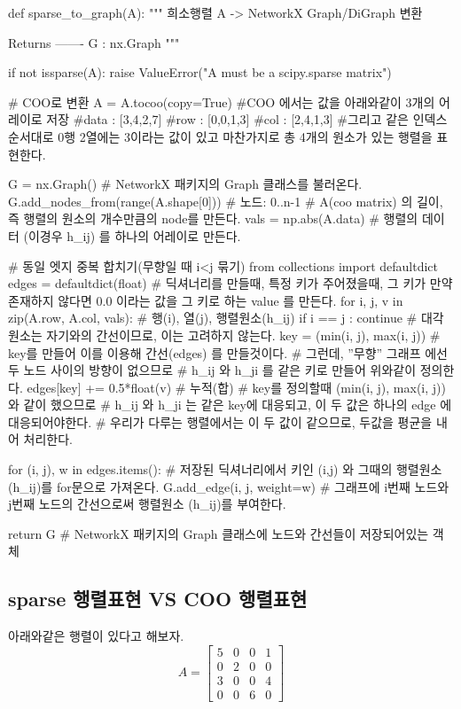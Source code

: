 \documentclass[11pt]{article}
\begin{document}
\begin{CodeBox}[title={Example: Python snippet}]
def sparse_to_graph(A):
    """
    희소행렬 A -> NetworkX Graph/DiGraph 변환

    Returns
    -------
    G : nx.Graph
    """
    
    if not issparse(A):
        raise ValueError("A must be a scipy.sparse matrix")
    
    # COO로 변환
    A = A.tocoo(copy=True)
    #COO 에서는 값을 아래와같이 3개의 어레이로 저장 
    #data : [3,4,2,7]
    #row : [0,0,1,3]
    #col : [2,4,1,3]
    #그리고 같은 인덱스 순서대로 0행 2열에는 3이라는 값이 있고 마찬가지로 총 4개의 원소가 있는 행렬을 표현한다. 

    G = nx.Graph()
    # NetworkX 패키지의 Graph 클래스를 불러온다. 
    G.add_nodes_from(range(A.shape[0]))  # 노드: 0..n-1
    # A(coo matrix) 의 길이, 즉 행렬의 원소의 개수만큼의 node를 만든다. 
    vals = np.abs(A.data)
    # 행렬의 데이터 (이경우 h_ij) 를 하나의 어레이로 만든다. 

    # 동일 엣지 중복 합치기(무향일 때 i<j 묶기)
    from collections import defaultdict
    edges = defaultdict(float)
    # 딕셔너리를 만들때, 특정 키가 주어졌을때, 그 키가 만약 존재하지 않다면 0.0 이라는 값을 그 키로 하는 value 를 만든다. 
    for i, j, v in zip(A.row, A.col, vals):
    # 행(i), 열(j), 행렬원소(h_ij)
        if i == j :
            continue
            # 대각원소는 자기와의 간선이므로, 이는 고려하지 않는다. 
        key = (min(i, j), max(i, j))
        # key를 만들어 이를 이용해 간선(edges) 를 만들것이다. 
        # 그런데, ''무향'' 그래프 에선 두 노드 사이의 방향이 없으므로
        # h_ij 와 h_ji 를 같은 키로 만들어 위와같이 정의한다. 
        edges[key] += 0.5*float(v) 
        # 누적(합)
        # key를 정의할때 (min(i, j), max(i, j))와 같이 했으므로 
        # h_ij 와 h_ji 는 같은 key에 대응되고, 이 두 값은 하나의 edge 에 대응되어야한다. 
        # 우리가 다루는 행렬에서는 이 두 값이 같으므로, 두값을 평균을 내어 처리한다. 

        for (i, j), w in edges.items():
        # 저장된 딕셔너리에서 키인 (i,j) 와 그때의 행렬원소 (h_ij)를 for문으로 가져온다.
            G.add_edge(i, j, weight=w)
            # 그래프에 i번째 노드와 j번째 노드의 간선으로써 행렬원소 (h_ij)를 부여한다. 

    return G # NetworkX 패키지의 Graph 클래스에 노드와 간선들이 저장되어있는 객체
\end{CodeBox}

\subsection{sparse 행렬표현 VS COO 행렬표현}
아래와같은 행렬이 있다고 해보자.
\[
A = \begin{bmatrix}
5 & 0 & 0 & 1 \\
0 & 2 & 0 & 0 \\
3 & 0 & 0 & 4 \\
0 & 0 & 6 & 0
\end{bmatrix}
\]
\end{document}
